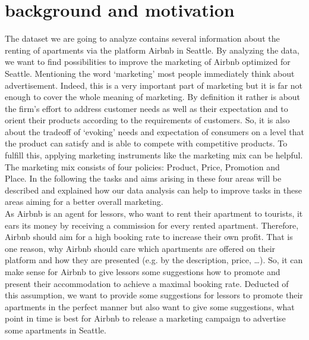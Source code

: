 \section{background and motivation}
 The dataset we are going to analyze contains several information about the renting of apartments via the platform Airbnb in Seattle. By analyzing the data, we want to find possibilities to improve the marketing of Airbnb optimized for Seattle. Mentioning the word ‘marketing’ most people immediately think about advertisement. Indeed, this is a very important part of marketing but it is far not enough to cover the whole meaning of marketing. By definition it rather is about the firm’s effort to address customer needs as well as their expectation and to orient their products according to the requirements of customers. So, it is also about the tradeoff of ‘evoking’ needs and expectation of consumers on a level that the product can satisfy and is able to compete with competitive products. To fulfill this, applying marketing instruments like the marketing mix can be helpful. The marketing mix consists of four policies: Product, Price, Promotion and Place. In the following the tasks and aims arising in these four areas will be described and explained how our data analysis can help to improve tasks in these areas aiming for a better overall marketing.\\As Airbnb is an agent for lessors, who want to rent their apartment to tourists, it ears its money by receiving a commission for every rented apartment. Therefore, Airbnb should aim for a high booking rate to increase their own profit. That is one reason, why Airbnb should care which apartments are offered on their platform and how they are presented (e.g. by the description, price, …). So, it can make sense for Airbnb to give lessors some suggestions how to promote and present their accommodation to achieve a maximal booking rate. Deducted of this assumption, we want to provide some suggestions for lessors to promote their apartments in the perfect manner but also want to give some suggestions, what point in time is best for Airbnb to release a marketing campaign to advertise some apartments in Seattle. 
